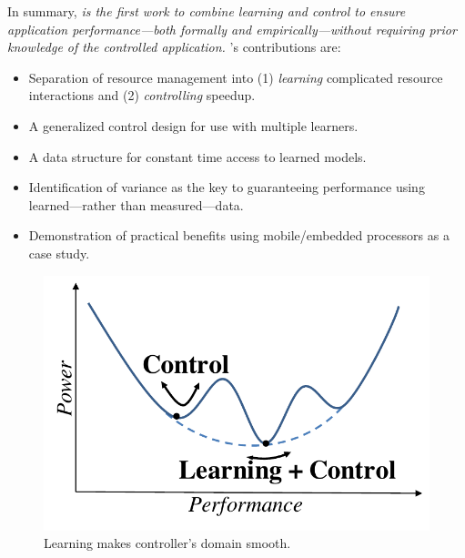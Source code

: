 In summary, \emph{\SYSTEM{} is the first work to combine learning and
  control to ensure application performance---both formally and
  empirically---without requiring prior knowledge of the controlled
  application.}  \SYSTEM{}'s contributions are:
\begin{itemize}[leftmargin=1em]
\item Separation of resource management into (1) \emph{learning}
  complicated resource interactions and (2) \emph{controlling}
  speedup.
\item A generalized control design for use with multiple learners.
\item A data structure for constant time access to learned models.
\item Identification of variance as the key to guaranteeing
  performance using learned---rather than measured---data.
\item Demonstration of practical benefits using mobile/embedded
  processors as a case study.
\end{itemize}

\begin{figure}
\centering
\includegraphics[width=.5\columnwidth]{figures/learning_control_doodle.pdf}
\caption{Learning makes controller's domain smooth.}
\label{fig:learning-control-doodle}
\end{figure}
